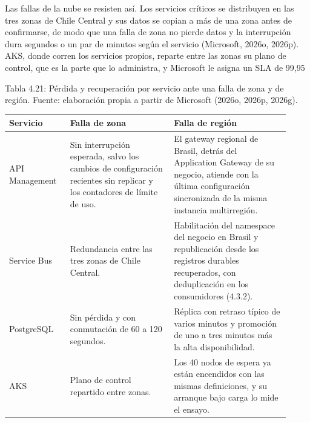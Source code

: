 \documentclass[11pt]{article}
\begin{document}
Las fallas de la nube se resisten así. Los servicios críticos se distribuyen en las tres zonas de Chile Central y sus datos se copian a más de una zona antes de confirmarse, de modo que una falla de zona no pierde datos y la interrupción dura segundos o un par de minutos según el servicio (Microsoft, 2026o, 2026p). AKS, donde corren los servicios propios, reparte entre las zonas su plano de control, que es la parte que lo administra, y Microsoft le asigna un SLA de 99,95 %

\par\vspace{0pt plus 10\baselineskip}\vspace{0pt plus -10\baselineskip}

Tabla 4.21: Pérdida y recuperación por servicio ante una falla de zona y de región. Fuente: elaboración propia a partir de Microsoft (2026o, 2026p, 2026g).\par\nopagebreak
\begin{longtable}{@{}p{0.20\linewidth}p{0.34\linewidth}p{0.38\linewidth}@{}}
\toprule Servicio & Falla de zona & Falla de región \\
\midrule\endhead\bottomrule\endlastfoot
API Management & Sin interrupción esperada, salvo los cambios de configuración recientes sin replicar y los contadores de límite de uso. & El gateway regional de Brasil, detrás del Application Gateway de su negocio, atiende con la última configuración sincronizada de la misma instancia multirregión. \\
Service Bus & Redundancia entre las tres zonas de Chile Central. & Habilitación del namespace del negocio en Brasil y republicación desde los registros durables recuperados, con deduplicación en los consumidores (4.3.2). \\
PostgreSQL & Sin pérdida y con conmutación de 60 a 120 segundos. & Réplica con retraso típico de varios minutos y promoción de uno a tres minutos más la alta disponibilidad. \\
AKS & Plano de control repartido entre zonas. & Los 40 nodos de espera ya están encendidos con las mismas definiciones, y su arranque bajo carga lo mide el ensayo. \\
\end{longtable}
\end{document}
